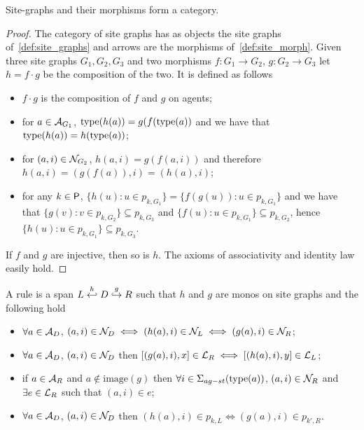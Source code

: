 \begin{lemma}
  Site-graphs and their morphisms form a category.
\end{lemma}
\begin{proof}
  The category of site graphs has as objects the site graphs of~\autoref{def:site_graphs} and arrows are the morphisms of~\autoref{def:site_morph}.
%
  Given three site graphs $G_1,G_2,G_3$ and two morphisms $f:G_1\to G_2$, $g:G_2\to G_3$ let $h=f\cdot g$ be the composition of the two. It is defined as follows
  \begin{itemize}
  \item $f\cdot g$ is the composition of $f$ and $g$ on agents;
  \item for $a\in\mathcal{A}_{G_1}$, $\operatorname{type}(h(a))=g(f(\operatorname{type}(a))$ and we have that $\operatorname{type}(h(a))=h(\operatorname{type}(a))$;
  \item for $(a,i)\in\mathcal{N}_{G_2}$, $h(a,i) = g(f(a,i))$ and therefore $h(a,i)=(g(f(a)),i)=(h(a),i)$;
  \item for any $k\in\mathsf{P}$, $\{h(u): u\in p_{k,G_1}\}=\{f(g(u)): u\in p_{k,G_1}\}$ and we have that $\{g(v): v\in p_{k,G_2}\}\subseteq p_{k,G_3}$ and $\{f(u): u\in p_{k,G_1}\}\subseteq p_{k,G_2}$, hence $\{h(u): u\in p_{k,G_1}\}\subseteq p_{k,G_3}$.
  \end{itemize}
  If $f$ and $g$ are injective, then so is $h$.
%
  The axioms of associativity and identity law easily hold.
\end{proof}

\begin{definition}
  \label{def:rule_site}
  A rule is a span $L\overset{h}{\hookleftarrow} D \overset{g}{\hookrightarrow} R$ such that $h$ and $g$ are monos on site graphs and the following hold
  \begin{itemize}
  \item $\forall a\in\mathcal{A}_D$, $(a,i)\in\mathcal{N}_D\iff (h(a),i)\in\mathcal{N}_L \iff (g(a),i)\in\mathcal{N}_R$;
  \item $\forall a\in\mathcal{A}_D$, $(a,i)\in\mathcal{N}_D$ then $[(g(a),i),x] \in\mathcal{L}_R \iff [(h(a),i),y] \in\mathcal{L}_L$;
  \item if $a\in\mathcal{A}_R$ and $a\notin\text{image}(g)$ then $\forall i\in\Sigma_{ag-st}(\operatorname{type}(a))$, $(a,i)\in\mathcal{N}_R$ and $\exists e\in \mathcal{L}_R$ such that $(a,i)\in e$;
  \item $\forall a\in\mathcal{A}_D$, $(a,i)\in\mathcal{N}_D$ then $(h(a),i)\in p_{k,L}\iff (g(a),i)\in p_{k',R}$.
  \end{itemize}
\end{definition}

